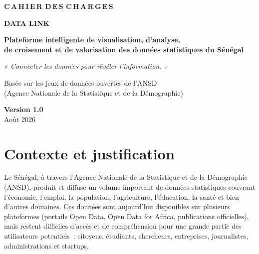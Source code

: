 \documentclass[11pt,a4paper]{article}
\begin{document}
\begin{titlepage}
\centering
\vspace*{3.5cm}

{\color{grey}\large\bfseries \fontsize{13}{15}\selectfont C\,A\,H\,I\,E\,R\;\; D\,E\,S\;\; C\,H\,A\,R\,G\,E\,S}

\vspace{0.8cm}
{\color{navy}\fontsize{48}{52}\selectfont\bfseries DATA LINK}

\vspace{0.7cm}
{\color{teal}\Large\bfseries Plateforme intelligente de visualisation, d'analyse,\\ de croisement et de valorisation des données statistiques du Sénégal}

\vspace{0.9cm}
{\color{gold}\itshape\large « Connecter les données pour révéler l'information. »}

\vspace{3cm}
{\color{grey} Basée sur les jeux de données ouvertes de l'ANSD\\ (Agence Nationale de la Statistique et de la Démographie)}

\vspace{3cm}
{\bfseries Version 1.0}\\
Août 2026

\end{titlepage}

\tableofcontents
\newpage

\section{Contexte et justification}

Le Sénégal, à travers l'Agence Nationale de la Statistique et de la Démographie (ANSD), produit et diffuse un volume important de données statistiques couvrant l'économie, l'emploi, la population, l'agriculture, l'éducation, la santé et bien d'autres domaines. Ces données sont aujourd'hui disponibles sur plusieurs plateformes (portails Open Data, Open Data for Africa, publications officielles), mais restent difficiles d'accès et de compréhension pour une grande partie des utilisateurs potentiels~: citoyens, étudiants, chercheurs, entreprises, journalistes, administrations et startups.
\end{document}
